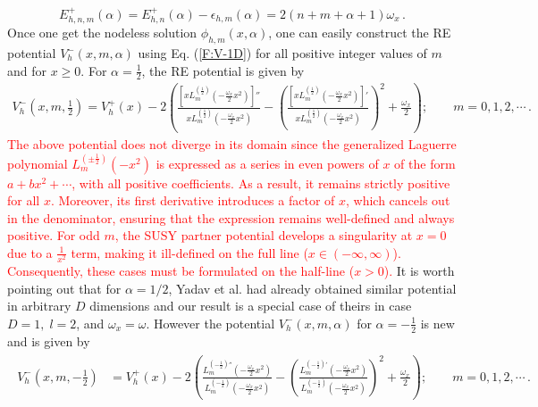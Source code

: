 \documentclass[12pt]{article}
\numberwithin{equation}{section} %
\begin{document}
\begin{equation}\label{HLO:E+}
E^+_{h,n,m}(\alpha)=E^+_{h,n}(\alpha)-\epsilon_{h,m}(\alpha) = 
2(n+m+\alpha+1)\omega_x\,.
\end{equation}
Once one get the nodeless solution $\phi_{h,m}(x,\alpha)$, one can easily 
construct the RE potential $V^-_h(x,m,\alpha)$ using Eq. (\ref{F:V-1D}) for all positive integer values of $m$ and for $x \ge 0$. For $\alpha=\frac{1}{2}$, the RE potential is given by
\begin{align}\label{HLO:V-alpha+}
V_h^-(x, m, \frac{1}{2}) = V_h^+(x) - 2\left( \frac{\left[x L_m^{(\frac{1}{2})}\left(-\frac{\omega_x}{2} x^2\right)\right]''}{x L_m^{(\frac{1}{2})}\left(-\frac{\omega_x}{2} x^2\right)} - \left( \frac{\left[x L_m^{(\frac{1}{2})}\left(-\frac{\omega_x}{2} x^2\right)\right]'}{x L_m^{(\frac{1}{2})}\left(-\frac{\omega_x}{2} x^2\right)} \right)^2 + \frac{\omega_x}{2} \right); \qquad m = 0,1,2,\cdots \,.
\end{align}
\textcolor{red}{The above potential does not diverge in its domain since the generalized Laguerre polynomial \( L^{(\pm\frac{1}{2})}_m(-x^2) \) is expressed as a series in even powers of \( x \) of the form \( a + bx^2 + \cdots \), with all positive coefficients. As a result, it remains strictly positive for all \( x \). Moreover, its first derivative introduces a factor of \( x \), which cancels out in the denominator, ensuring that the expression remains well-defined and always positive. For odd \( m \), the SUSY partner potential develops a singularity at \( x = 0 \) due to a \( \frac{1}{x^2} \) term, making it ill-defined on the full line (\( x \in (-\infty, \infty) \)). Consequently, these cases must be formulated on the half-line (\( x > 0 \)).}
It is worth pointing out that for $\alpha = 1/2$, Yadav et al. 
\cite{yadava2017rationally} had 
already obtained similar potential in arbitrary $D$ dimensions and our result is a special case of theirs in case \( D = 1, \; l = 2\), and 
$\omega_x = \omega$. 
However the potential \(V_h^-(x,m,\alpha)\) for $\alpha=-\frac{1}{2}$ is new and is given by 
\begin{align}
\begin{split}\label{HLO:V-alpha-}
V_h^-(x,m,-\frac{1}{2}) &= V_h^+(x) - 2\left( \frac{L_m^{(-\frac{1}{2})''}
\left(-\frac{\omega_x}{2} x^2\right)}{L_m^{(-\frac{1}{2})}
\left(-\frac{\omega_x}{2} x^2\right)} - \left( \frac{L_m^{(-\frac{1}{2})'}
\left(-\frac{\omega_x}{2} x^2\right)}{L_m^{(-\frac{1}{2})}
\left(-\frac{\omega_x}{2} x^2\right)} \right)^2 + \frac{\omega_x}{2} \right);
\qquad m=0,1,2,\cdots \,.
    \end{split}
\end{align}
\end{document}
